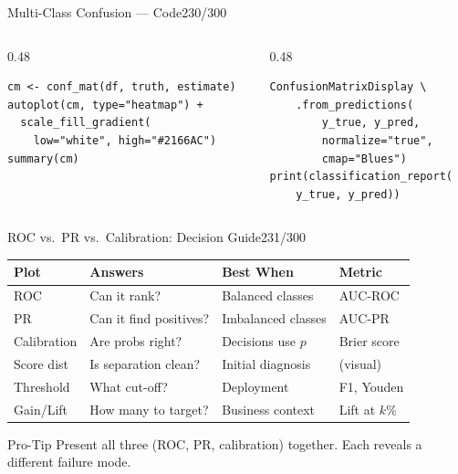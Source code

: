 \documentclass[10pt]{beamer}
\newcommand{\smark}[1]{\hfill{\scriptsize\color{codegray}#1}}
\begin{document}
\begin{frame}[fragile]{Multi-Class Confusion --- Code}\smark{230/300}
\begin{columns}[T]
\begin{column}{0.48\textwidth}
\begin{lstlisting}[style=Rstyle]
cm <- conf_mat(df, truth, estimate)
autoplot(cm, type="heatmap") +
  scale_fill_gradient(
    low="white", high="#2166AC")
summary(cm)
\end{lstlisting}
\end{column}
\begin{column}{0.48\textwidth}
\begin{lstlisting}[style=Pystyle]
ConfusionMatrixDisplay \
    .from_predictions(
        y_true, y_pred,
        normalize="true",
        cmap="Blues")
print(classification_report(
    y_true, y_pred))
\end{lstlisting}
\end{column}
\end{columns}
\end{frame}

\begin{frame}{ROC vs.\ PR vs.\ Calibration: Decision Guide}\smark{231/300}
\centering\small
\begin{tabular}{@{}llll@{}}
    \toprule
    \textbf{Plot} & \textbf{Answers} & \textbf{Best When} & \textbf{Metric} \\
    \midrule
    ROC          & Can it rank?           & Balanced classes   & AUC-ROC \\
    PR           & Can it find positives? & Imbalanced classes & AUC-PR \\
    Calibration  & Are probs right?       & Decisions use $p$  & Brier score \\
    Score dist   & Is separation clean?   & Initial diagnosis  & (visual) \\
    Threshold    & What cut-off?          & Deployment         & F1, Youden \\
    Gain/Lift    & How many to target?    & Business context   & Lift at $k$\% \\
    \bottomrule
\end{tabular}
\vspace{0.2cm}
\begin{alertblock}{Pro-Tip}
    \scriptsize Present all three (ROC, PR, calibration) together. Each reveals a different failure mode.
\end{alertblock}
\end{frame}
\end{document}
